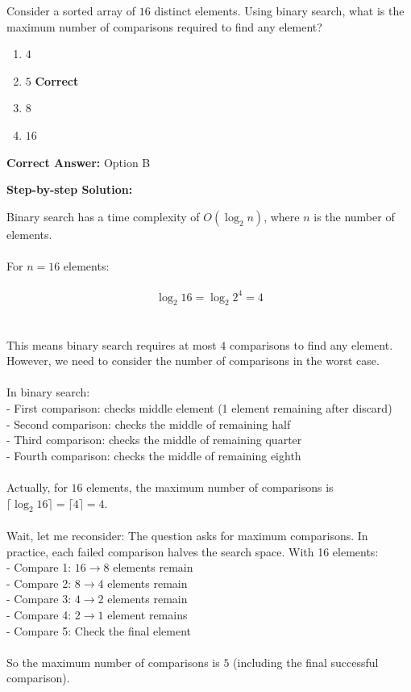 \documentclass[11pt]{article}
\begin{document}
Consider a sorted array of \(16\) distinct elements. Using binary search, what is the maximum number of comparisons required to find any element?


\begin{enumerate}[label=\textbf{\Alph*.}, leftmargin=1.8em]
\item \(4\)\item \(5\) \hfill {\color{gategreen}\textbf{Correct}}\item \(8\)\item \(16\)\end{enumerate}

\textbf{Correct Answer:} Option B

\textbf{Step-by-step Solution:}

Binary search has a time complexity of \(O(\log_2 n)\), where \(n\) is the number of elements.\\
\\
For \(n = 16\) elements:\\
\\
\[\log_2 16 = \log_2 2^4 = 4\]\\
\\
This means binary search requires at most \(4\) comparisons to find any element. However, we need to consider the number of comparisons in the worst case.\\
\\
In binary search:\\
- First comparison: checks middle element (1 element remaining after discard)\\
- Second comparison: checks the middle of remaining half\\
- Third comparison: checks the middle of remaining quarter\\
- Fourth comparison: checks the middle of remaining eighth\\
\\
Actually, for \(16\) elements, the maximum number of comparisons is \(\lceil \log_2 16 \rceil = \lceil 4 \rceil = 4\).\\
\\
Wait, let me reconsider: The question asks for maximum comparisons. In practice, each failed comparison halves the search space. With 16 elements:\\
- Compare 1: \(16 \to 8\) elements remain\\
- Compare 2: \(8 \to 4\) elements remain\\
- Compare 3: \(4 \to 2\) elements remain\\
- Compare 4: \(2 \to 1\) element remains\\
- Compare 5: Check the final element\\
\\
So the maximum number of comparisons is \(5\) (including the final successful comparison).
\end{document}
